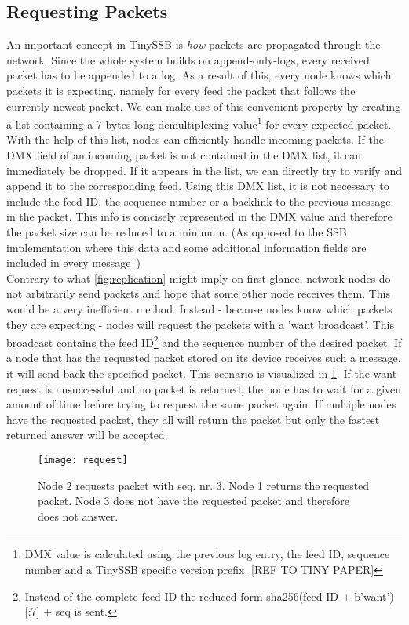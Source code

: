 \subsection{Requesting Packets}
An important concept in TinySSB is \textit{how} packets are propagated through the network. Since the whole system builds on append-only-logs, every received packet has to be appended to a log. As a result of this, every node knows which packets it is expecting, namely for every feed the packet that follows the currently newest packet. We can make use of this convenient property by creating a list containing a 7 bytes long demultiplexing value\footnote{DMX value is calculated using the previous log entry, the feed ID, sequence number and a TinySSB specific version prefix. [REF TO TINY PAPER]} for every expected packet. With the help of this list, nodes can efficiently handle incoming packets. If the DMX field of an incoming packet is not contained in the DMX list, it can immediately be dropped. If it appears in the list, we can directly try to verify and append it to the corresponding feed. Using this DMX list, it is not necessary to include the feed ID, the sequence number or a backlink to the previous message in the packet. This info is concisely represented in the DMX value and therefore the packet size can be reduced to a minimum. (As opposed to the SSB implementation where this data and some additional information fields are included in every message~\cite{10.1145/3357150.3357396}) \\
Contrary to what \cref{fig:replication} might imply on first glance, network nodes do not arbitrarily send packets and hope that some other node receives them. This would be a very inefficient method. Instead - because nodes know which packets they are expecting - nodes will request the packets with a 'want broadcast'. This broadcast contains the feed ID\footnote{Instead of the complete feed ID the reduced form sha256(feed ID + b'want')[:7] + seq is sent.} and the sequence number of the desired packet. If a node that has the requested packet stored on its device receives such a message, it will send back the specified packet. This scenario is visualized in \cref{fig:request}. If the want request is unsuccessful and no packet is returned, the node has to wait for a given amount of time before trying to request the same packet again. If multiple nodes have the requested packet, they all will return the packet but only the fastest returned answer will be accepted.

\begin{figure}
\centering
\texttt{[image: request]}
\caption{Node 2 requests packet with seq. nr. 3. Node 1 returns the requested packet. Node 3 does not have the requested packet and therefore does not answer.}
\label{fig:request}
\end{figure}

